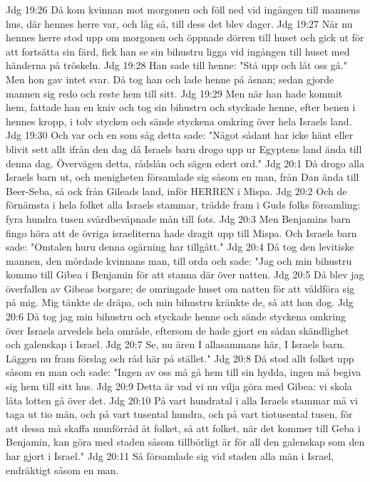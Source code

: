 Jdg 19:26  Då kom kvinnan mot morgonen och föll ned vid ingången till mannens hus, där hennes herre var, och låg så, till dess det blev dager.
Jdg 19:27  När nu hennes herre stod upp om morgonen och öppnade dörren till huset och gick ut för att fortsätta sin färd, fick han se sin bihustru ligga vid ingången till huset med händerna på tröskeln.
Jdg 19:28  Han sade till henne: "Stå upp och låt oss gå." Men hon gav intet svar. Då tog han och lade henne på åsnan; sedan gjorde mannen sig redo och reste hem till sitt.
Jdg 19:29  Men när han hade kommit hem, fattade han en kniv och tog sin bihustru och styckade henne, efter benen i hennes kropp, i tolv stycken och sände styckena omkring över hela Israels land.
Jdg 19:30  Och var och en som såg detta sade: "Något sådant har icke hänt eller blivit sett allt ifrån den dag då Israels barn drogo upp ur Egyptens land ända till denna dag. Övervägen detta, rådslån och sägen edert ord."
Jdg 20:1  Då drogo alla Israels barn ut, och menigheten församlade sig såsom en man, från Dan ända till Beer-Seba, så ock från Gileads land, inför HERREN i Mispa.
Jdg 20:2  Och de förnämsta i hela folket alla Israels stammar, trädde fram i Guds folks församling: fyra hundra tusen svärdbeväpnade mån till fots.
Jdg 20:3  Men Benjamins barn fingo höra att de övriga israeliterna hade dragit upp till Mispa. Och Israels barn sade: "Omtalen huru denna ogärning har tillgått."
Jdg 20:4  Då tog den levitiske mannen, den mördade kvinnans man, till orda och sade: "Jag och min bihustru kommo till Gibea i Benjamin för att stanna där över natten.
Jdg 20:5  Då blev jag överfallen av Gibeas borgare; de omringade huset om natten för att våldföra sig på mig. Mig tänkte de dräpa, och min bihustru kränkte de, så att hon dog.
Jdg 20:6  Då tog jag min bihustru och styckade henne och sände styckena omkring över Israels arvedels hela område, eftersom de hade gjort en sådan skändlighet och galenskap i Israel.
Jdg 20:7  Se, nu ären I allasammans här, I Israels barn. Läggen nu fram förslag och råd här på stället."
Jdg 20:8  Då stod allt folket upp såsom en man och sade: "Ingen av oss må gå hem till sin hydda, ingen må begiva sig hem till sitt hus.
Jdg 20:9  Detta är vad vi nu vilja göra med Gibea: vi skola låta lotten gå över det.
Jdg 20:10  På vart hundratal i alla Israels stammar må vi taga ut tio män, och på vart tusental hundra, och på vart tiotusental tusen, för att dessa må skaffa munförråd åt folket, så att folket, när det kommer till Geba i Benjamin, kan göra med staden såsom tillbörligt är för all den galenskap som den har gjort i Israel."
Jdg 20:11  Så församlade sig vid staden alla män i Israel, endräktigt såsom en man.
